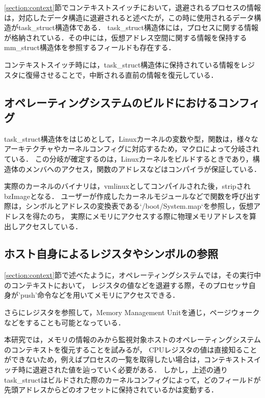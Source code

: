 \ref{section:context}節でコンテキストスイッチにおいて，退避されるプロセスの情報は，対応したデータ構造に退避されると述べたが，この時に使用されるデータ構造がtask\_struct構造体である．
task\_struct構造体には，プロセスに関する情報が格納されている．その中には，仮想アドレス空間に関する情報を保持するmm\_struct構造体を参照するフィールドも存在する．

コンテキストスイッチ時には，task\_struct構造体に保持されている情報をレジスタに復帰させることで，中断される直前の情報を復元している．

\subsection{オペレーティングシステムのビルドにおけるコンフィグ}

task\_struct構造体をはじめとして，Linuxカーネルの変数や型，関数は，様々なアーキテクチャやカーネルコンフィグに対応するため，マクロによって分岐されている．
この分岐が確定するのは，Linuxカーネルをビルドするときであり，構造体のメンバへのアクセス，関数のアドレスなどはコンパイラが保証している．

実際のカーネルのバイナリは，vmlinuxとしてコンパイルされた後，stripされbzImageとなる．
ユーザーが作成したカーネルモジュールなどで関数を呼び出す際は，シンボルとアドレスの変換表である`/boot/System.map`を参照し，仮想アドレスを得たのち，
実際にメモリにアクセスする際に物理メモリアドレスを算出しアクセスしている．

\subsection{ホスト自身によるレジスタやシンボルの参照}

\ref{section:context}節で述べたように，オペレーティングシステムでは，その実行中のコンテキストにおいて，
レジスタの値などを退避する際，そのプロセッサ自身が'push'命令などを用いてメモリにアクセスできる．

さらにレジスタを参照して，Memory Management Unitを通じ，ページウォークなどをすることも可能となっている．

本研究では，メモリの情報のみから監視対象ホストのオペレーティングシステムのコンテキストを復元することを試みるが，
CPUレジスタの値は直接知ることができないため，例えばプロセスの一覧を取得したい場合は，コンテキストスイッチ時に退避された値を辿っていく必要がある．
しかし，上述の通りtask\_structはビルドされた際のカーネルコンフィグによって，どのフィールドが先頭アドレスからどのオフセットに保持されているかは変動する．


